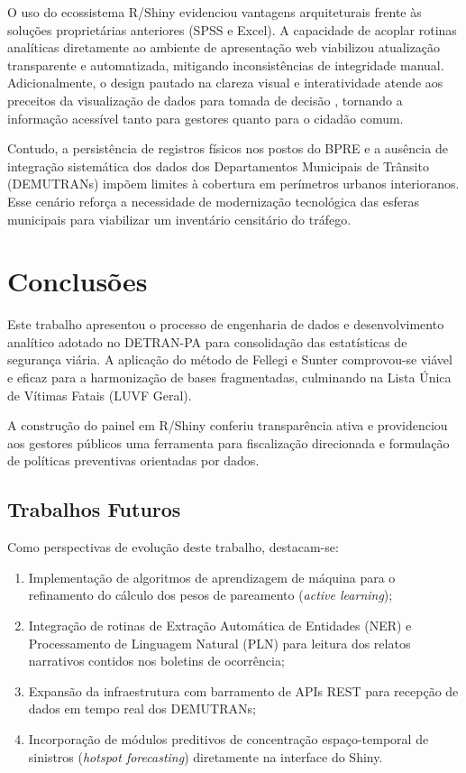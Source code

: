\documentclass[sigconf, nonacm, screen, language=portuguese, language=spanish, language={main=english}]{acmart}
\begin{document}
O uso do ecossistema R/Shiny evidenciou vantagens arquiteturais frente às soluções proprietárias anteriores (SPSS e Excel). A capacidade de acoplar rotinas analíticas diretamente ao ambiente de apresentação web viabilizou atualização transparente e automatizada, mitigando inconsistências de integridade manual. Adicionalmente, o design pautado na clareza visual e interatividade atende aos preceitos da visualização de dados para tomada de decisão \cite{few2013}, tornando a informação acessível tanto para gestores quanto para o cidadão comum.

Contudo, a persistência de registros físicos nos postos do BPRE e a ausência de integração sistemática dos dados dos Departamentos Municipais de Trânsito (DEMUTRANs) impõem limites à cobertura em perímetros urbanos interioranos. Esse cenário reforça a necessidade de modernização tecnológica das esferas municipais para viabilizar um inventário censitário do tráfego.

\section{Conclusões}\label{sec:conclusao}
Este trabalho apresentou o processo de engenharia de dados e desenvolvimento analítico adotado no DETRAN-PA para consolidação das estatísticas de segurança viária. A aplicação do método de Fellegi e Sunter comprovou-se viável e eficaz para a harmonização de bases fragmentadas, culminando na Lista Única de Vítimas Fatais (LUVF Geral). 

A construção do painel em R/Shiny conferiu transparência ativa e providenciou aos gestores públicos uma ferramenta para fiscalização direcionada e formulação de políticas preventivas orientadas por dados.

\subsection{Trabalhos Futuros}\label{sec:trabalhos_futuros}
Como perspectivas de evolução deste trabalho, destacam-se:
\begin{enumerate}
    \item Implementação de algoritmos de aprendizagem de máquina para o refinamento do cálculo dos pesos de pareamento (\textit{active learning});
    \item Integração de rotinas de Extração Automática de Entidades (NER) e Processamento de Linguagem Natural (PLN) para leitura dos relatos narrativos contidos nos boletins de ocorrência;
    \item Expansão da infraestrutura com barramento de APIs REST para recepção de dados em tempo real dos DEMUTRANs;
    \item Incorporação de módulos preditivos de concentração espaço-temporal de sinistros (\textit{hotspot forecasting}) diretamente na interface do Shiny.
\end{enumerate}
\end{document}
